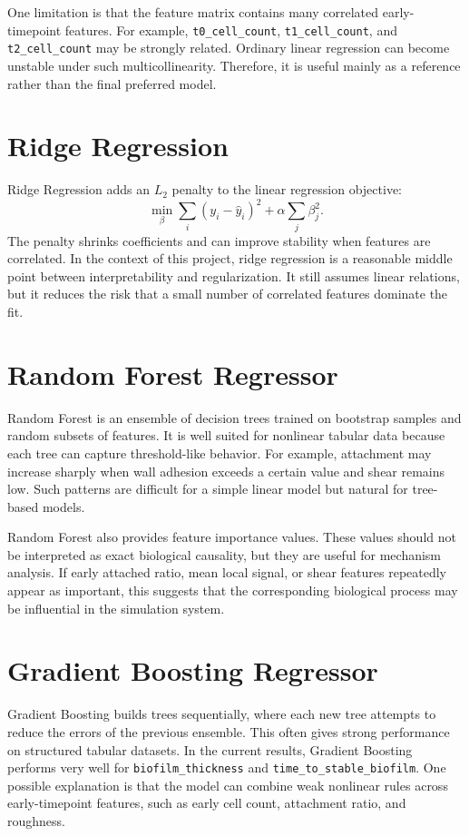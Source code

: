 \documentclass[12pt,a4paper,oneside]{report}
\begin{document}
One limitation is that the feature matrix contains many correlated early-timepoint features. For example, \texttt{t0\_cell\_count}, \texttt{t1\_cell\_count}, and \texttt{t2\_cell\_count} may be strongly related. Ordinary linear regression can become unstable under such multicollinearity. Therefore, it is useful mainly as a reference rather than the final preferred model.

\section{Ridge Regression}
Ridge Regression adds an \(L_2\) penalty to the linear regression objective:
\begin{equation}
\min_{\beta}\sum_i(y_i-\hat{y}_i)^2+\alpha\sum_j\beta_j^2.
\end{equation}
The penalty shrinks coefficients and can improve stability when features are correlated. In the context of this project, ridge regression is a reasonable middle point between interpretability and regularization. It still assumes linear relations, but it reduces the risk that a small number of correlated features dominate the fit.

\section{Random Forest Regressor}
Random Forest is an ensemble of decision trees trained on bootstrap samples and random subsets of features. It is well suited for nonlinear tabular data because each tree can capture threshold-like behavior. For example, attachment may increase sharply when wall adhesion exceeds a certain value and shear remains low. Such patterns are difficult for a simple linear model but natural for tree-based models.

Random Forest also provides feature importance values. These values should not be interpreted as exact biological causality, but they are useful for mechanism analysis. If early attached ratio, mean local signal, or shear features repeatedly appear as important, this suggests that the corresponding biological process may be influential in the simulation system.

\section{Gradient Boosting Regressor}
Gradient Boosting builds trees sequentially, where each new tree attempts to reduce the errors of the previous ensemble. This often gives strong performance on structured tabular datasets. In the current results, Gradient Boosting performs very well for \texttt{biofilm\_thickness} and \texttt{time\_to\_stable\_biofilm}. One possible explanation is that the model can combine weak nonlinear rules across early-timepoint features, such as early cell count, attachment ratio, and roughness.
\end{document}
